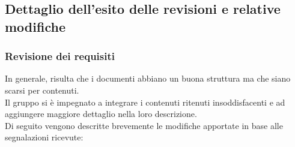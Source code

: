 \subsection{Dettaglio dell'esito delle revisioni e relative modifiche}
	\subsubsection{Revisione dei requisiti}
		In generale, risulta che i documenti abbiano un buona struttura ma che siano scarsi per contenuti. \\
		Il gruppo si è impegnato a integrare i contenuti ritenuti insoddisfacenti e ad aggiungere maggiore dettaglio nella loro descrizione.\\ 
		 Di seguito vengono descritte brevemente le modifiche apportate in base alle segnalazioni ricevute:
